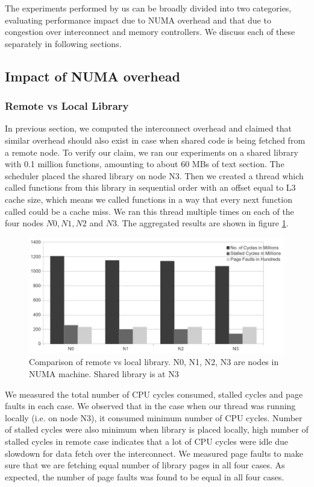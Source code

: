 
The experiments performed by us can be broadly divided into two categories, evaluating performance
impact due to NUMA overhead and that due to congestion over interconnect and memory controllers.
We discuss each of these separately in following sections.
\subsection{Impact of NUMA overhead}

\subsubsection{Remote vs Local Library} \label{sec:remoteVsLocal}
In previous section, we computed the interconnect overhead and claimed that similar overhead should 
also exist in case when shared code is being fetched from a remote node.
To verify our claim, we ran our experiments on a shared library with 0.1 million functions, amounting to
about 60 MBs of text section. The scheduler placed the shared library on node N3.
Then we created a thread which called functions from this library in sequential order with an offset equal to 
L3 cache size, which means we called functions in a way that every next function called could be a cache miss.
We ran this thread multiple times on each of the four nodes $N0, N1, N2$ and $N3$.
The aggregated results are shown in figure \ref{fig:remoteVsLocal}.

\begin{figure}
    \centering
    \includegraphics[scale=0.38]{remoteVsLocal.png}
    \caption{Comparison of remote vs local library. N0, N1, N2, N3 are nodes in NUMA machine. Shared library is at N3 }
    \label{fig:remoteVsLocal}
\end{figure}

We measured the total number of CPU cycles consumed, stalled cycles and page faults in each case.
We observed that in the case when our thread was running locally (i.e. on node N3), it consumed minimum number of CPU cycles.
Number of stalled cycles were also minimum when library is placed locally, high number of stalled cycles in remote case indicates
that a lot of CPU cycles were idle due slowdown for data fetch over the interconnect.
We measured page faults to make sure that we are fetching equal number of library pages in all four cases.
As expected, the number of page faults was found to be equal in all four cases.

